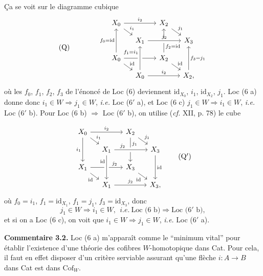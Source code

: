 \documentclass[11pt]{article}
\newcommand{\printedpage}[1]{\marginpar{\footnotesize p.~#1}}
\newcommand{\id}{\mathrm{id}}
\newcommand{\Cof}{\mathrm{Cof}}
\begin{document}
Ça se voit sur le diagramme cubique
\[
\text{(Q)}\qquad\qquad
\begin{tikzcd}[row sep=small,column sep=small]
X_0 \arrow[rr,"i_2"] \arrow[dr,"i_1"] & & X_2 \arrow[dr,"j_1"] \arrow[from=dd,"f_2=\id"' near start] & \\
& X_1 \arrow[rr,"j_2",crossing over] & & X_3 \\
X_0 \arrow[uu,"f_0=\id"] \arrow[rr,"i_2"] \arrow[dr,"\id"] & & X_2 \arrow[dr,"\id"] & \\
& X_0 \arrow[rr,"i_2"] \arrow[uu,crossing over,"f_1=i_1" near end] & & X_2, \arrow[uu,"f_3=j_1"']
\end{tikzcd}
\]
où les $f_0$, $f_1$, $f_2$, $f_3$ de l'énoncé de Loc (6) deviennent $\id_{X_0}$, $i_1$, $\id_{X_2}$, $j_1$. Loc (6 a) donne donc $i_1\in W\Longrightarrow j_1\in W$, \textit{i.e.} Loc (6$'$ a), et Loc (6 c) $j_1\in W\Longrightarrow i_1\in W$, \textit{i.e.} Loc (6$'$ b). Pour Loc (6 b) $\Longrightarrow$ Loc (6$'$ b), on utilise (\textit{cf.} XII, p. 78) le cube

\noindent\printedpage{14}
\[
\begin{tikzcd}[ampersand replacement=\&, row sep=small, column sep=small]
X_0 \arrow[rr, "i_2"] \arrow[dr, "i_1"] \arrow[dd, "i_1"'] \& \& X_2 \arrow[dr, "j_1"] \arrow[dd, "j_1" near start] \& \\
\& X_1 \arrow[rr, "j_2" near start, crossing over] \& \& X_3 \arrow[dd, "\id"] \\
X_1 \arrow[rr, "j_2" near end] \arrow[dr, "\id"'] \& \& X_3 \arrow[dr, "\id"'] \& \\
\& X_1 \arrow[rr, "j_2"] \arrow[from=2-2, "\id"' near start, crossing over] \& \& X_3,
\end{tikzcd}
\tag*{(Q$'$)} %
\]
où $f_0 = i_1$, $f_1 = \id_{X_1}$, $f_1 = j_1$, $f_3 = \id_{X_3}$, donc %
\[
j_1 \in W \Longrightarrow i_1 \in W, \ \ \textit{i.e.}\ \text{Loc (6 b)} \Longrightarrow \text{Loc (6$'$ b)},
\]
et si on a Loc (6 c), on voit que $i_1 \in W \Longrightarrow j_1 \in W$, \textit{i.e.} Loc (6$'$ a).

\textbf{Commentaire 3.2.} Loc (6 a) m'apparaît comme le “minimum vital” pour établir l'existence d'une théorie des cofibres $W$-homotopique dans Cat. Pour cela, il faut en effet disposer d'un critère serviable assurant qu'une flèche $i : A \longrightarrow B$ dans Cat est dans $\Cof_W$.
\end{document}

